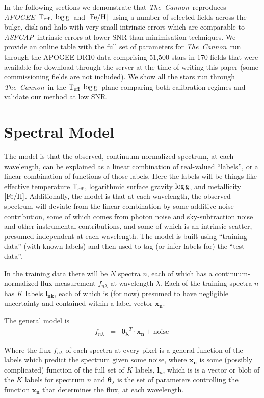 \documentclass[12pt, preprint]{aastex}
\newcommand{\set}[1]{\bm{#1}}
\newcommand{\teff}{\mbox{$\rm T_{eff}$}}
\newcommand{\feh}{\mbox{$\rm [Fe/H]$}}
\newcommand{\logg}{\mbox{$\rm \log g$}}
\newcommand{\tc}{\textsl{The~Cannon}}
\newcommand{\apogee}{\textsl{APOGEE}}
\newcommand{\aspcap}{\textsl{ASPCAP}}
\begin{document}
In the following sections we demonstrate that \tc\ reproduces \apogee\ \teff, \logg\ and \feh\ using a number of selected fields across the bulge, disk and halo with very small intrinsic errors which are comparable to \aspcap\ intrinsic errors at lower SNR than minimisation techniques. We provide an online table with the full set of parameters for \tc\ run through the APOGEE DR10 data comprising 51,500 stars in 170 fields that were available for download through the server at the time of writing this paper (some commissioning fields are not included).  We show all the stars run through \tc\ in the \teff-\logg\ plane comparing both calibration regimes and validate our method at low SNR.





\section{Spectral Model}
\label{sec:spectralmodel}

The model is that the observed, continuum-normalized spectrum, at each
wavelength, can be explained as a linear combination of real-valued
``labels'', or a linear combination of functions of those labels.
Here the labels will be things like effective temperature $\teff$,
logarithmic surface gravity $\logg$, and metallicity $\feh$.
Additionally, the model is that at each wavelength, the observed
spectrum will deviate from the linear combination by some additive
noise contribution, some of which comes from photon noise and
sky-subtraction noise and other instrumental contributions, and some
of which is an intrinsic scatter, presumed independent at each
wavelength.
The model is built using ``training data'' (with known labels) and then
used to tag (or infer labels for) the ``test data''.

In the training data there will be $N$ spectra $n$, each of which has
a continuum-normalized flux measurement $f_{n\lambda}$ at wavelength
$\lambda$. Each of the training spectra $n$ has $K$ labels $\boldsymbol{l_{nk}}$, each of which
is (for now) presumed to have negligible uncertainty and contained within a label vector $\boldsymbol{x_n}$.

The general model is
\begin{eqnarray}
f_{n\lambda} &=&
\boldsymbol{\theta_\lambda}^T \cdot \boldsymbol{x_n} + \mbox{noise}
\
\end{eqnarray}

Where the flux $f_{n\lambda}$ of each spectra at every pixel is a general function of the labels which predict the spectrum given some noise, where $\boldsymbol{x_n}$ is some (possibly complicated) function of the full set of $K$ labels, $\set{l}_n$, which is is a vector or blob of the $K$ labels for spectrum $n$ and $\set{\theta}_\lambda$ is the set of parameters controlling the function $\boldsymbol{x_n}$ that determines the flux, at each wavelength.
\end{document}
